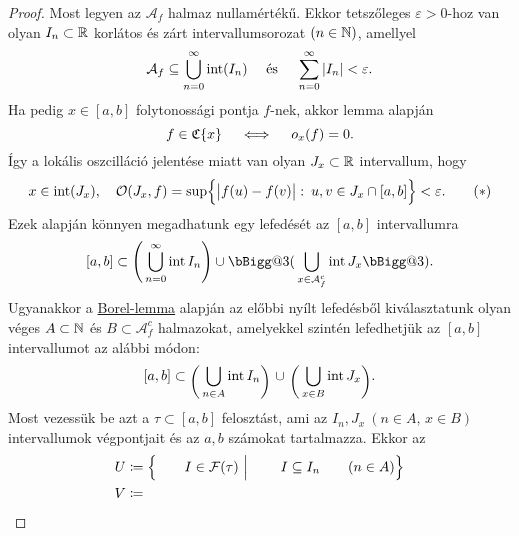 \documentclass[
]{elteikthesis}[2024/04/26]
\makeatletter
\def\biggg{\bBigg@{3}}
\def\bigggl{\mathopen\biggg}
\def\bigggr{\mathclose\biggg}
\makeatother
\begin{document}
\begin{proof}
		\newpage
		
		\Backifstep
		Most legyen az \( \mathcal{A}_f \) halmaz nullamértékű. 
		Ekkor tetszőleges \( \varepsilon > 0 \)-hoz van olyan 
		\( I_n \subset \mathbb{R} \) korlátos és zárt intervallumsorozat \( (n \in \mathbb{N}) \), amellyel%
		\[
			\mathcal{A}_f \subseteq \bigcup_{n=0}^{\infty} \operatorname{int}( I_n )
			\quad \text{ és } \quad
			\sum_{n = 0}^{\infty} \abs{ I_n } < \varepsilon.
		\]
		Ha pedig \( x \in [a, b] \) folytonossági pontja \( f \)-nek, 
		akkor  lemma alapján
		\[
			f \in \mathfrak{C} \{ x \} \quad \iff \quad o_x(f) = 0.
		\]
		Így a lokális oszcilláció jelentése miatt van olyan \( J_x \subset \mathbb{R} \) intervallum, hogy
		\[\label{eq:oszcilláció-felső-becslése}
			x \in \operatorname{int}(J_x), \quad
			\mathcal{O}(J_x, f) = 
			\sup \Bigl\{ \abs\big{ f(u) - f(v) } \,\colon\, u, v \in J_x \cap [a, b] \Bigr\}
			< \varepsilon.
			\tag{\( * \)}
		\]
		Ezek alapján könnyen megadhatunk egy lefedését az \( [a, b] \) intervallumra%
		\[
			[a, b] \subset 
			\Biggl(\, \bigcup_{n=0}^{\infty} \inter I_n  \Biggr) \cup
			\bigggl(\, \bigcup_{x \in \mathcal{A}_f^c} \inter J_x \bigggr).
		\]
		Ugyanakkor a \hyperref[lem:borel-lefedés]{Borel-lemma} alapján az előbbi nyílt lefedésből kiválasztatunk
		olyan véges \( A \subset \mathbb{N} \) és \( B \subset \mathcal{A}_f^c \) halmazokat, 
		amelyekkel szintén lefedhetjük az \( [a, b] \) intervallumot az alábbi módon:
		\[
			[a, b] \subset 
			\mathopen{\raisebox{-0.9ex}{$ \biggl( $}}\,
			\bigcup_{n \in A} \inter I_n
			\mathopen{\raisebox{-0.9ex}{$ \biggr) $}} 
			\ \cup \
			\mathopen{\raisebox{-0.9ex}{$ \biggl( $}}\,
			\bigcup_{x \in B} \inter J_x
			\mathopen{\raisebox{-0.9ex}{$ \biggr) $}}.
		\]
		Most vezessük be azt a \( \tau \subset [a, b] \) felosztást, 
		ami az \( I_n, J_x \ (n \in A,\, x \in B) \) intervallumok végpontjait 
		és az \( a, b \) számokat tartalmazza. Ekkor az
		\begin{alignat*}{6}
			U &\coloneq \Bigl\{ 
				&& & I &\in \mathcal{F}(\tau) \ \Big\vert \ && & I &\subseteq I_n &&\quad (n \in A) 
			\Bigr\} \\
			V &\coloneq 

\end{alignat*}
\end{proof}
\end{document}

